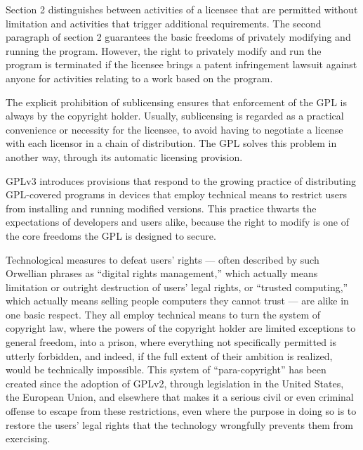 
Section 2 distinguishes between activities of a licensee that are permitted
without limitation and activities that trigger additional requirements. The
second paragraph of section 2 guarantees the basic freedoms of privately
modifying and running the program. However, the right to privately modify and
run the program is terminated if the licensee brings a patent infringement
lawsuit against anyone for activities relating to a work based on the
program.

The explicit prohibition of sublicensing ensures that enforcement of the GPL
is always by the copyright holder.  Usually, sublicensing is regarded as a
practical convenience or necessity for the licensee, to avoid having to
negotiate a license with each licensor in a chain of distribution.  The GPL
solves this problem in another way, through its automatic licensing
provision.


GPLv3 introduces provisions that respond to the growing practice of
distributing GPL-covered programs in devices that employ technical means
to restrict users from installing and running modified versions.  This
practice thwarts the expectations of developers and users alike, because
the right to modify is one of the core freedoms the GPL is designed to
secure.

Technological measures to defeat users' rights --- often described by such
Orwellian phrases as ``digital rights management,'' which actually means
limitation or outright destruction of users' legal rights, or ``trusted
computing,'' which actually means selling people computers they cannot trust
--- are alike in one basic respect.  They all employ technical means to turn
the system of copyright law, where the powers of the copyright holder are
limited exceptions to general freedom, into a prison, where everything not
specifically permitted is utterly forbidden, and indeed, if the full extent
of their ambition is realized, would be technically impossible.  This system
of ``para-copyright'' has been created since the adoption of GPLv2, through
legislation in the United States, the European Union, and elsewhere that
makes it a serious civil or even criminal offense to escape from these
restrictions, even where the purpose in doing so is to restore the users'
legal rights that the technology wrongfully prevents them from exercising.

